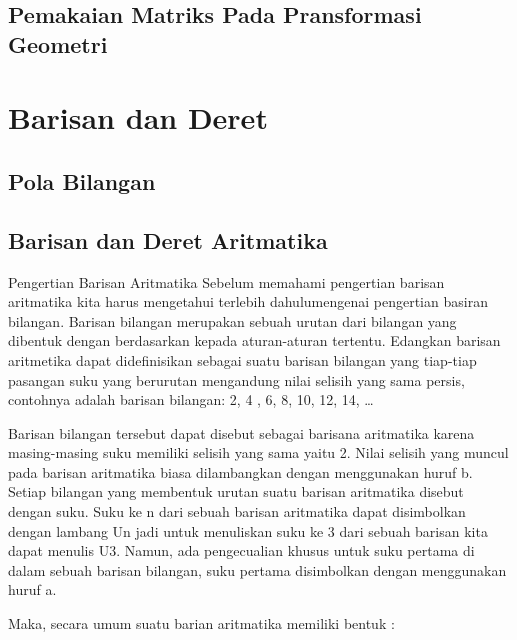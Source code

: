 \documentclass[11pt,fleqn]{book} %
\begin{document}
\section{Pemakaian Matriks Pada Pransformasi Geometri}



\chapter{Barisan dan Deret}

\section{Pola Bilangan}

\section{Barisan dan Deret Aritmatika}
Pengertian Barisan Aritmatika
Sebelum memahami pengertian barisan aritmatika kita harus mengetahui terlebih dahulumengenai pengertian basiran bilangan. Barisan bilangan merupakan sebuah urutan dari bilangan yang dibentuk dengan berdasarkan kepada aturan-aturan tertentu. Edangkan barisan aritmetika dapat didefinisikan sebagai suatu barisan bilangan yang tiap-tiap pasangan suku yang berurutan mengandung nilai selisih yang sama persis, contohnya adalah barisan bilangan: 2, 4 , 6, 8, 10, 12, 14, …

Barisan bilangan tersebut dapat disebut sebagai barisana aritmatika karena masing-masing suku memiliki selisih yang sama yaitu 2. Nilai selisih yang muncul pada barisan aritmatika biasa dilambangkan dengan menggunakan huruf b. Setiap bilangan yang membentuk urutan suatu barisan aritmatika disebut dengan suku. Suku ke n dari sebuah barisan aritmatika dapat disimbolkan dengan lambang Un jadi untuk menuliskan suku ke 3 dari sebuah barisan kita dapat menulis U3. Namun, ada pengecualian khusus untuk suku pertama di dalam sebuah barisan bilangan, suku pertama disimbolkan dengan menggunakan huruf a.

Maka, secara umum suatu barian aritmatika memiliki bentuk :
\end{document}
